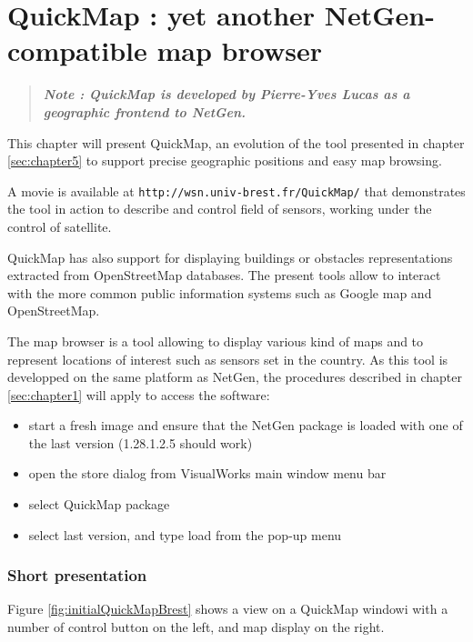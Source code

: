 
\chapter{QuickMap : yet another NetGen-compatible map browser}

\begin{quote}

{\sl \bf{Note :} QuickMap is developed by Pierre-Yves Lucas as a geographic frontend to NetGen.}

\end{quote}

\label{sec:chapter5bis}

This chapter will present QuickMap, an evolution of the tool presented in chapter \ref{sec:chapter5}
to support precise geographic positions and easy map  browsing. 

A movie is available at {\tt http://wsn.univ-brest.fr/QuickMap/} that demonstrates 
the tool in action to describe and control field of sensors,  working
under the control of satellite.

QuickMap has also support for displaying 
buildings or obstacles representations extracted from OpenStreetMap databases. 
The present tools allow to interact with the more common public information systems 
such as Google map and OpenStreetMap. 

The map browser is a tool allowing to display various kind of maps and to represent 
locations of interest such as sensors set in the country. 
As this tool is developped on the same platform as NetGen, the procedures described 
in chapter \ref{sec:chapter1} will apply to access the software: 
\begin{itemize}
\item start a fresh image and ensure that the NetGen package is loaded with one of the last version (1.28.1.2.5 should work)
\item open the store dialog from VisualWorks main window menu bar
\item select QuickMap package 
\item select last version, and type load from the pop-up menu
\end{itemize}

\subsection{Short presentation}

Figure 
\ref{fig:initialQuickMapBrest} shows a view on a QuickMap windowi with a number
of control button on the left, and map display on the right.


